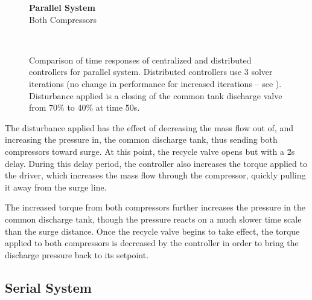 \begin{figure}
  {\centering\large\textbf{Parallel System}\\Both Compressors\\[1em]}
  \begin{subfigure}{0.48\linewidth}
    \footnotesize
    
    \normalsize
  \end{subfigure}
  \hfill
  \begin{subfigure}{0.48\linewidth}
    \footnotesize
    
    \normalsize
  \end{subfigure}
  \\
  \begin{subfigure}{0.48\linewidth}
    \footnotesize
    
    \normalsize
  \end{subfigure}
  \hfill
  \begin{subfigure}{0.48\linewidth}
    \footnotesize
    
    \normalsize
  \end{subfigure}
  \caption{Comparison of time responses of centralized and distributed controllers for parallel system. Distributed controllers use 3 solver iterations (no change in performance for increased iterations -- see ). Disturbance applied is a closing of the common tank discharge valve from 70\% to 40\% at time \u{50}{s}.}
  \label{fig:res:parallel-timeresp}
\end{figure}

\fi

The disturbance applied has the effect of decreasing the mass flow out of, and increasing the pressure in, the common discharge tank, thus sending both compressors toward surge.
At this point, the recycle valve opens but with a \u{2}{s} delay.
During this delay period, the controller also increases the torque applied to the driver, which increases the mass flow through the compressor, quickly pulling it away from the surge line.

The increased torque from both compressors further increases the pressure in the common discharge tank, though the pressure reacts on a much slower time scale than the surge distance.
Once the recycle valve begins to take effect, the torque applied to both compressors is decreased by the controller in order to bring the discharge pressure back to its setpoint.





\subsection{Serial System}
\label{sec:results:performance:serial}
\makeplotstrue

